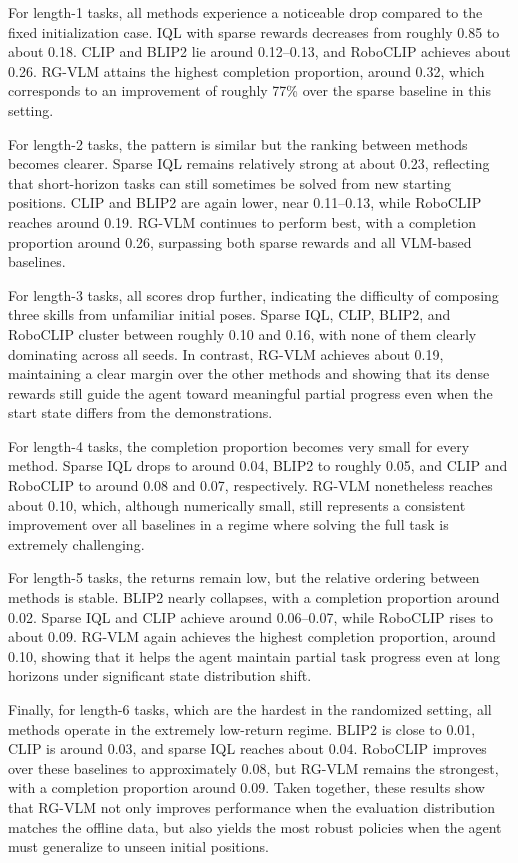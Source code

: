 \documentclass[master,english,final]{kaist-ucs}
\begin{document}
For length-1 tasks, all methods experience a noticeable drop compared to the fixed initialization case. IQL with sparse rewards decreases from roughly 0.85 to about 0.18. CLIP and BLIP2 lie around 0.12–0.13, and RoboCLIP achieves about 0.26. RG-VLM attains the highest completion proportion, around 0.32, which corresponds to an improvement of roughly 77\% over the sparse baseline in this setting.

For length-2 tasks, the pattern is similar but the ranking between methods becomes clearer. Sparse IQL remains relatively strong at about 0.23, reflecting that short-horizon tasks can still sometimes be solved from new starting positions. CLIP and BLIP2 are again lower, near 0.11–0.13, while RoboCLIP reaches around 0.19. RG-VLM continues to perform best, with a completion proportion around 0.26, surpassing both sparse rewards and all VLM-based baselines.

For length-3 tasks, all scores drop further, indicating the difficulty of composing three skills from unfamiliar initial poses. Sparse IQL, CLIP, BLIP2, and RoboCLIP cluster between roughly 0.10 and 0.16, with none of them clearly dominating across all seeds. In contrast, RG-VLM achieves about 0.19, maintaining a clear margin over the other methods and showing that its dense rewards still guide the agent toward meaningful partial progress even when the start state differs from the demonstrations.

For length-4 tasks, the completion proportion becomes very small for every method. Sparse IQL drops to around 0.04, BLIP2 to roughly 0.05, and CLIP and RoboCLIP to around 0.08 and 0.07, respectively. RG-VLM nonetheless reaches about 0.10, which, although numerically small, still represents a consistent improvement over all baselines in a regime where solving the full task is extremely challenging.

For length-5 tasks, the returns remain low, but the relative ordering between methods is stable. BLIP2 nearly collapses, with a completion proportion around 0.02. Sparse IQL and CLIP achieve around 0.06–0.07, while RoboCLIP rises to about 0.09. RG-VLM again achieves the highest completion proportion, around 0.10, showing that it helps the agent maintain partial task progress even at long horizons under significant state distribution shift.

Finally, for length-6 tasks, which are the hardest in the randomized setting, all methods operate in the extremely low-return regime. BLIP2 is close to 0.01, CLIP is around 0.03, and sparse IQL reaches about 0.04. RoboCLIP improves over these baselines to approximately 0.08, but RG-VLM remains the strongest, with a completion proportion around 0.09. Taken together, these results show that RG-VLM not only improves performance when the evaluation distribution matches the offline data, but also yields the most robust policies when the agent must generalize to unseen initial positions.
\end{document}
